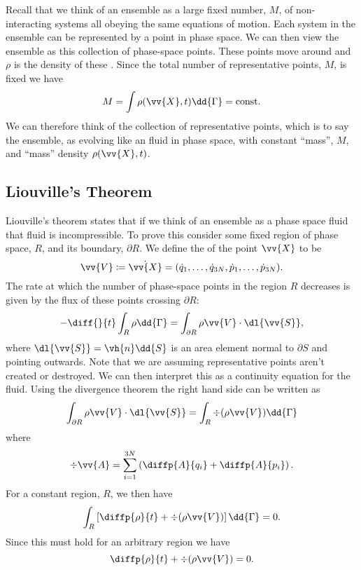 \documentclass[fleqn]{NotesClass}
\begin{document}
    Recall that we think of an ensemble as a large fixed number, \(M\), of non-interacting systems all obeying the same equations of motion.
    Each system in the ensemble can be represented by a point in phase space.
    We can then view the ensemble as this collection of phase-space points.
    These points move around and \(\rho\) is the density of these .
    Since the total number of representative points, \(M\), is fixed we have
    \begin{equation}
        M = \int \rho(\vv{X}, t) \dd{\Gamma} = \mathrm{const}.
    \end{equation}
    We can therefore think of the collection of representative points, which is to say the ensemble, as evolving like an fluid in phase space, with constant \enquote{mass}, \(M\), and \enquote{mass} density \(\rho(\vv{X}, t)\).
    
    \subsection{Liouville's Theorem}
    Liouville's theorem states that if we think of an ensemble as a phase space fluid that fluid is incompressible.
    To prove this consider some fixed region of phase space, \(R\), and its boundary, \(\partial R\).
    We define the  of the point \(\vv{X}\) to be
    \begin{equation}
        \vv{V} \coloneqq \dot{\vv{X}} = (\dot{q}_1, \dotsc, \dot{q}_{3N}, \dot{p}_1, \dotsc, \dot{p}_{3N}).
    \end{equation}
    The rate at which the number of phase-space points in the region \(R\) decreases is given by the flux of these points crossing \(\partial R\):
    \begin{equation}
        -\diff{}{t} \int_R \rho \dd{\Gamma} = \int_{\partial R} \rho \vv{V} \cdot \dl{\vv{S}},
    \end{equation}
    where \(\dl{\vv{S}} = \vh{n}\dd{S}\) is an area element normal to \(\partial S\) and pointing outwards.
    Note that we are assuming representative points aren't created or destroyed.
    We can then interpret this as a continuity equation for the fluid.
    Using the divergence theorem the right hand side can be written as
    \begin{equation}
        \int_{\partial R} \rho \vv{V}\cdot\dl{\vv{S}} = \int_{R} \div (\rho\vv{V}) \dd{\Gamma}
    \end{equation}
    where
    \begin{equation}
        \div \vv{A} = \sum_{i = 1}^{3N} \left( \diffp{A}{q_i} + \diffp{A}{p_i} \right).
    \end{equation}
    For a constant region, \(R\), we then have
    \begin{equation}
        \int_{R} \left[ \diffp{\rho}{t} + \div(\rho\vv{V}) \right] \dd{\Gamma} = 0.
    \end{equation}
    Since this must hold for an arbitrary region we have
    \begin{equation}
        \diffp{\rho}{t} + \div(\rho\vv{V}) = 0.
    \end{equation}
    
\end{document}
